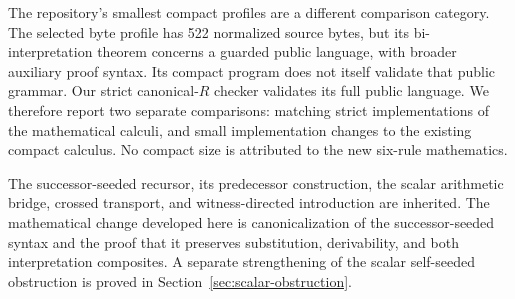 The repository's smallest compact profiles are a different comparison
category. The selected byte profile has 522 normalized source bytes, but its
bi-interpretation theorem concerns a guarded public language, with broader
auxiliary proof syntax. Its compact program does not itself validate that
public grammar. Our strict canonical-$R$ checker validates its full public
language. We therefore report two separate comparisons: matching strict
implementations of the mathematical calculi, and small implementation
changes to the existing compact calculus. No compact size is attributed to
the new six-rule mathematics.

The successor-seeded recursor, its predecessor construction, the scalar
arithmetic bridge, crossed transport, and witness-directed introduction are
inherited. The mathematical change developed here is canonicalization of the
successor-seeded syntax and the proof that it preserves substitution,
derivability, and both interpretation composites. A separate strengthening
of the scalar self-seeded obstruction is proved in
Section~\ref{sec:scalar-obstruction}.

